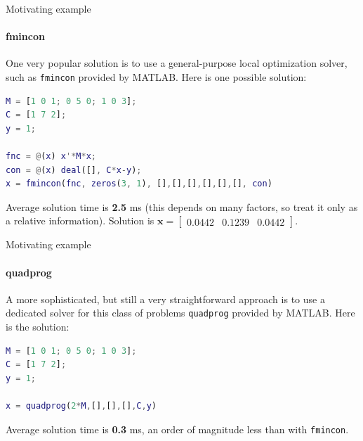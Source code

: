 \documentclass{beamer}
\begin{document}
\begin{frame}[fragile]{Motivating example}
\framesubtitle{fmincon}
\begin{flushleft}

One very popular solution is to use a general-purpose local optimization solver, such as \texttt{fmincon} provided by MATLAB. Here is one possible solution:

\begin{lstlisting}[language=Matlab]
M = [1 0 1; 0 5 0; 1 0 3]; 
C = [1 7 2]; 
y = 1;

fnc = @(x) x'*M*x;
con = @(x) deal([], C*x-y);
x = fmincon(fnc, zeros(3, 1), [],[],[],[],[],[], con)
\end{lstlisting}

Average solution time is \textbf{2.5} ms (this depends on many factors, so treat it only as a relative information). 
Solution is $\mathbf{x} = \begin{bmatrix} 0.0442 & 0.1239 & 0.0442 \end{bmatrix}$.

\end{flushleft}
\end{frame}


\begin{frame}[fragile]{Motivating example}
\framesubtitle{quadprog}
\begin{flushleft}

A more sophisticated, but still a very straightforward approach is to use a dedicated solver for this class of problems \texttt{quadprog} provided by MATLAB. Here is the solution:

\begin{lstlisting}[language=Matlab]
M = [1 0 1; 0 5 0; 1 0 3]; 
C = [1 7 2]; 
y = 1;

x = quadprog(2*M,[],[],[],C,y)
\end{lstlisting}

Average solution time is \textbf{0.3} ms, an order of magnitude less than with \texttt{fmincon}.

\end{flushleft}
\end{frame}
\end{document}
